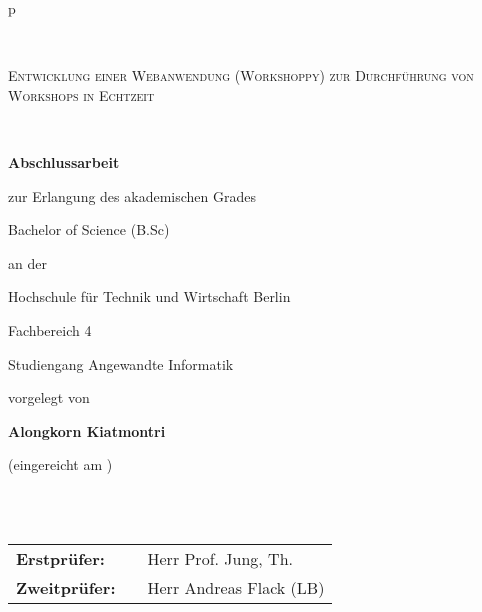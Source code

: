 \begin{center}
\begin{tabular}{p{\textwidth}}




\\

\begin{center}
\LARGE{\textsc{
Entwicklung einer Webanwendung (Workshoppy) zur
Durchführung von Workshops in Echtzeit\\
}}
\end{center}

\\

\begin{center}
\textbf{\Large{Abschlussarbeit}}
\end{center}

\begin{center}
zur Erlangung des akademischen Grades\par
Bachelor of Science (B.Sc)
\end{center}

\begin{center}
an der\par
\end{center}

\begin{center}
\large{Hochschule für Technik und Wirtschaft Berlin\par
Fachbereich 4\par
Studiengang Angewandte Informatik \\}
\end{center}

\begin{center}
vorgelegt von
\end{center}

\begin{center}
\large{\textbf{Alongkorn Kiatmontri}} \\
\end{center}

\begin{center}
\large{(eingereicht am )}
\end{center}

\\

\\

\begin{center}
\begin{tabular}{lll}
\textbf{Erstprüfer:} & & Herr Prof. Jung, Th.\\
\textbf{Zweitprüfer:} & & Herr Andreas Flack (LB)\\
\end{tabular}
\end{center}

\end{tabular}
\end{center}
